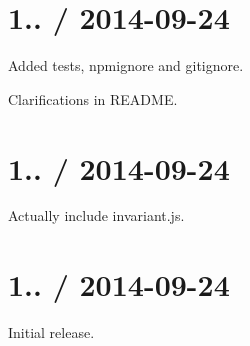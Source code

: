 \section*{1.. / 2014-\/09-\/24 }


\begin{DoxyItemize}
\item Added tests, npmignore and gitignore.
\item Clarifications in R\+E\+A\+D\+ME.
\end{DoxyItemize}

\section*{1.. / 2014-\/09-\/24 }


\begin{DoxyItemize}
\item Actually include \textquotesingle{}invariant.\+js\textquotesingle{}.
\end{DoxyItemize}

\section*{1.. / 2014-\/09-\/24 }


\begin{DoxyItemize}
\item Initial release. 
\end{DoxyItemize}